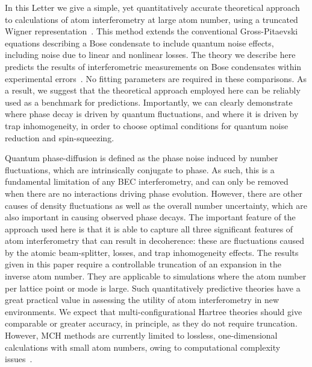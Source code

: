 \documentclass[aps,prl,twocolumn,showpacs,amsmath,amssymb,superscriptaddress]{revtex4-1}
\begin{document}
In this Letter we give a simple, yet quantitatively accurate
theoretical approach to calculations of atom interferometry at large atom number,
using a truncated Wigner representation~\cite{Drummond1993,Steel1998,Sinatra2002}.
This method extends the conventional Gross-Pitaevski equations
describing a Bose condensate to include quantum noise effects, including noise due to linear and nonlinear losses.
The theory we describe here predicts the results of
interferometric measurements on Bose condensates within experimental errors~\cite{Egorov2010}.
No fitting parameters are required in these comparisons.
As a result, we suggest that the theoretical approach employed here
can be reliably used as a benchmark for predictions.
Importantly, we can clearly demonstrate where phase decay is driven by quantum fluctuations,
and where it is driven by trap inhomogeneity, in order to choose optimal conditions for quantum noise reduction and spin-squeezing.

Quantum phase-diffusion is defined as the phase noise induced by number fluctuations,
which are intrinsically conjugate to phase.
As such, this is a fundamental limitation of any BEC interferometry,
and can only be removed when there are no interactions driving phase evolution.
However, there are other causes of density fluctuations as well as the overall number uncertainty,
which are also important in causing observed phase decays.
The important feature of the approach used here is that it is able to capture
all three significant features of atom interferometry that can result in decoherence:
these are fluctuations caused by the atomic beam-splitter, losses,
and trap inhomogeneity effects.
The results given in this paper require a controllable truncation
of an expansion in the inverse atom number.
They are applicable to simulations where the atom number per lattice point or mode is large.
Such quantitatively predictive theories have a great practical value
in assessing the utility of atom interferometry in new environments.
We expect that multi-configurational Hartree theories should give comparable or greater accuracy,
in principle, as they do not require truncation.
However, MCH methods are currently limited to lossless,
one-dimensional calculations with small atom numbers,
owing to computational complexity issues~\cite{Sakmann2009}.
\end{document}
